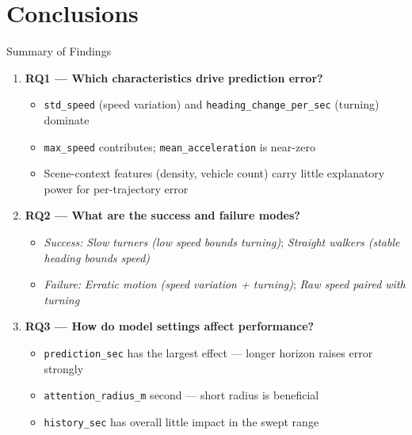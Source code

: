 
\section{Conclusions}

\begin{frame}{Summary of Findings}
  \begin{enumerate}
    \item<1-> \textbf{RQ1 — Which characteristics drive prediction error?}
    \begin{itemize}
      \item \texttt{std\_speed} (speed variation) and
            \texttt{heading\_change\_per\_sec} (turning) dominate
      \item \texttt{max\_speed} contributes; \texttt{mean\_acceleration}
            is near-zero
      \item Scene-context features (density, vehicle count) carry little
            explanatory power for per-trajectory error
    \end{itemize}
    \item<2-> \textbf{RQ2 — What are the success and failure modes?}
    \begin{itemize}
      \item \emph{Success:} \emph{Slow turners (low speed bounds turning)}; \emph{Straight walkers (stable heading bounds speed)}
      \item \emph{Failure:} \emph{Erratic motion (speed variation + turning)}; \emph{Raw speed paired with turning}
    \end{itemize}
    \item<3-> \textbf{RQ3 — How do model settings affect performance?}
    \begin{itemize}
      \item \texttt{prediction\_sec} has the largest effect — longer
            horizon raises error strongly
      \item \texttt{attention\_radius\_m} second — short radius is
            beneficial
      \item \texttt{history\_sec} has overall little impact in the swept range
    \end{itemize}
  \end{enumerate}
\end{frame}

